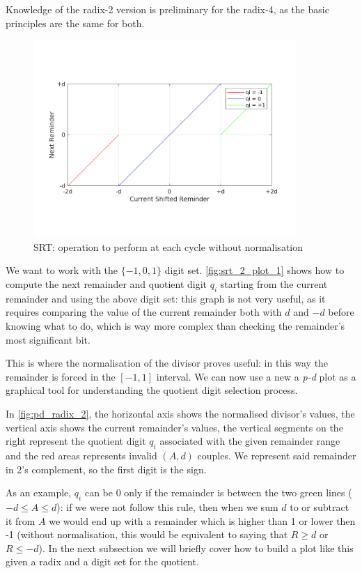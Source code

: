 Knowledge of the radix-2 version is preliminary for the radix-4, as the basic principles are the same for both. 

\begin{figure}
    \centering
    \includegraphics[width=100mm]{images/srt_2_plot_1.png}
    \caption{SRT: operation to perform at each cycle without normalisation}
    \label{fig:srt_2_plot_1}
\end{figure}

We want to work with the $\{-1, 0, 1\}$ digit set. 
\autoref{fig:srt_2_plot_1}  shows how to compute the next remainder and quotient digit $q_i$ starting from the current remainder and using the above digit set: this graph is not very useful, as it requires comparing the value of the current remainder both with $d$ and $-d$ before knowing what to do, which is way more complex than checking the remainder's most significant bit. 

This is where the normalisation of the divisor proves useful: in this way the remainder is forced in the $[-1, 1]$ interval.
We can now use a new a \textit{p-d} plot as a graphical tool for understanding the quotient digit selection process.

In \autoref{fig:pd_radix_2}, the horizontal axis shows the normalised divisor's values, the vertical axis shows the current remainder's values, the vertical segments on the right represent the quotient digit $q_i$ associated with the given remainder range and the red areas represents invalid $\left(A, d \right)$ couples.
We represent said remainder in 2's complement, so the first digit is the sign.

 As an example, $q_i$ can be 0 only if the remainder is between the two green lines ($-d \leq A \leq d$): if we were not follow this rule, then when we sum $d$ to or subtract it from $A$ we would end up with a remainder which is higher than 1 or lower then -1 (without normalisation, this would be equivalent to saying that $R \ge d$ or $R \leq -d$). 
In the next subsection we will briefly cover how to build a plot like this given a radix and a digit set for the quotient.

